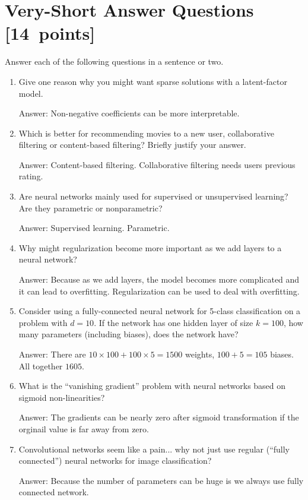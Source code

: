 \documentclass{article}
\newcommand{\blu}[1]{{\textcolor{blu}{#1}}}
\newenvironment{answer}{\par\begingroup\color{gre}Answer: }{\endgroup}
\let\ask\blu
\newcommand\pts[1]{\textcolor{pointscolour}{[#1~points]}}
\begin{document}
\clearpage
\section{Very-Short Answer Questions \pts{14}}

\ask{Answer each of the following questions in a sentence or two.}
\begin{enumerate}

\item Give one reason why you might want sparse solutions with a latent-factor model.
\begin{answer}
	Non-negative coefficients can be more interpretable.
\end{answer}

\item Which is better for recommending movies to a new user, collaborative filtering or content-based filtering? Briefly justify your answer.
\begin{answer}
	Content-based filtering. Collaborative filtering needs users previous rating.
\end{answer}

\item{Are neural networks mainly used for supervised or unsupervised learning? Are they parametric or nonparametric?}
\begin{answer}
	Supervised learning. Parametric.
\end{answer}

\item{Why might regularization become more important as we add layers to a neural network?}
\begin{answer}
	Because as we add layers, the model becomes more complicated and it can lead to overfitting. Regularization can be used to deal with overfitting.
\end{answer}

\item{Consider using a fully-connected neural network for 5-class classification on a problem with $d=10$. If the network has one hidden layer of size $k=100$, how many parameters (including biases), does the network have?}
\begin{answer}
	There are $10 \times 100 + 100 \times 5 = 1500$ weights, $100 + 5 = 105$ biases. All together $1605$.
\end{answer}

\item What is the ``vanishing gradient'' problem with neural networks based on sigmoid non-linearities?
\begin{answer}
	The gradients can be nearly zero after sigmoid transformation if the orginail value is far away from zero.
\end{answer}
\item{Convolutional networks seem like a pain... why not just use regular (``fully connected'') neural networks for image classification?}
\begin{answer}
	Because the number of parameters can be huge is we always use fully connected network.
\end{answer}

\end{enumerate}
\end{document}
